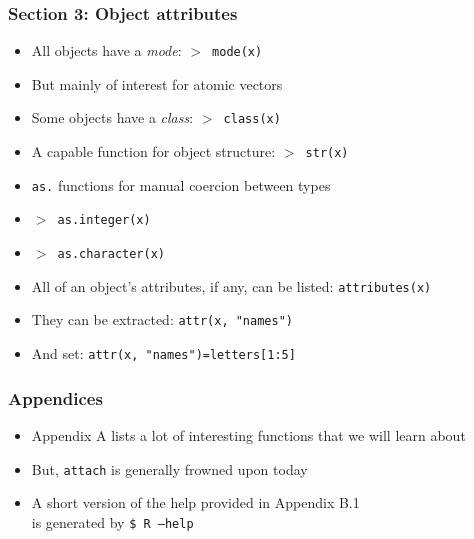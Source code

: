 \documentclass[11pt,pdftex,dvipsnames,usenames,helvetica]{beamer}
\begin{document}
\begin{frame}
\frametitle{Section 3: Object attributes}

\begin{itemize}
\item All objects have a {\it mode}: {\tt $>$ mode(x)}
\item But mainly of interest for atomic vectors
\item Some objects have a {\it class}: {\tt $>$ class(x)}
\item A capable function for object structure: {\tt $>$ str(x)}
\item {\tt as.} functions for manual coercion between types
\item {\tt $>$ as.integer(x)}
\item {\tt $>$ as.character(x)}
\item All of an object's attributes, if any, can be listed:
{\tt attributes(x)}
\item They can be extracted: {\tt attr(x, "names")}
\item And set: {\tt attr(x, "names")=letters[1:5]}

\end{itemize}

\end{frame}

\begin{frame} 
\frametitle{Appendices}

\begin{itemize}
\item Appendix A lists a lot of interesting functions that we will learn about
\item But, {\tt attach} is generally frowned upon today
\item A short version of the help provided in Appendix B.1 \\
is generated by {\tt \$ R --help}
\end{itemize}

\end{frame}
\end{document}
